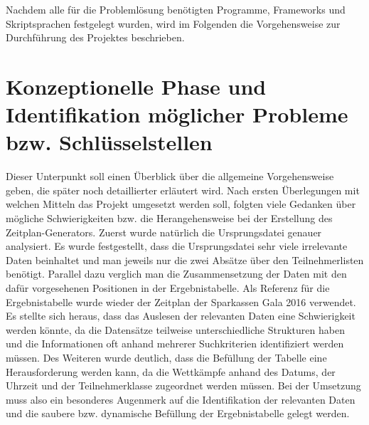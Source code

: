 {Nachdem alle für die Problemlösung benötigten Programme, Frameworks und Skriptsprachen festgelegt wurden, wird im Folgenden die Vorgehensweise zur Durchführung des Projektes beschrieben.

\section{Konzeptionelle Phase und Identifikation möglicher Probleme bzw. Schlüsselstellen
}
Dieser Unterpunkt soll einen Überblick über die allgemeine Vorgehensweise geben, die später noch detaillierter erläutert wird. Nach ersten Überlegungen mit welchen Mitteln das Projekt umgesetzt werden soll, folgten viele Gedanken über mögliche Schwierigkeiten bzw. die Herangehensweise bei der Erstellung des Zeitplan-Generators. Zuerst wurde natürlich die Ursprungsdatei genauer analysiert. Es wurde festgestellt, dass die Ursprungsdatei sehr viele irrelevante Daten beinhaltet und man jeweils nur die zwei Absätze über den Teilnehmerlisten benötigt. Parallel dazu verglich man die Zusammensetzung der Daten mit den dafür vorgesehenen Positionen in der Ergebnistabelle. Als Referenz für die Ergebnistabelle wurde wieder der Zeitplan der Sparkassen Gala 2016 verwendet. Es stellte sich heraus, dass das Auslesen der relevanten Daten eine Schwierigkeit werden könnte, da die Datensätze teilweise unterschiedliche Strukturen haben und die Informationen oft anhand mehrerer Suchkriterien identifiziert werden müssen. Des Weiteren wurde deutlich, dass die Befüllung der Tabelle eine Herausforderung werden kann, da die Wettkämpfe anhand des Datums, der Uhrzeit und der Teilnehmerklasse zugeordnet werden müssen. Bei der Umsetzung muss also ein besonderes Augenmerk auf die Identifikation der relevanten Daten und die saubere bzw. dynamische Befüllung der Ergebnistabelle gelegt werden. 

}
